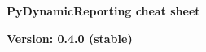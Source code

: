 \documentclass[9pt,landscape]{article}
\begin{document}
\raggedright
\footnotesize


\begin{center}
     \Huge{\textbf{PyDynamicReporting cheat sheet}} \\
\end{center}
\begin{center}
  \small{\textbf{Version: 0.4.0 (stable)}} \\
\end{center}
\vspace{-0.15cm}
\noindent\makebox[\linewidth]{\rule{\paperwidth}{2pt}}
\end{document}
